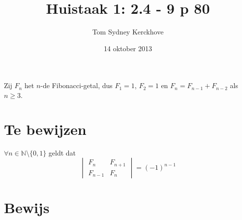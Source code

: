 \documentclass[10pt,a4paper]{article}
\title{Huistaak 1: 2.4 - 9 p 80}
\date{14 oktober 2013}
\author{Tom Sydney Kerckhove}
\begin{document}
\maketitle

Zij $F_{n}$ het $n$-de Fibonacci-getal, dus $F_{1}=1$, $F_{2}=1$ en $F_{n}=F_{n-1}+F_{n-2}$ als $n \ge 3$.
\section*{Te bewijzen}
$\forall n \in \mathbb{N}\setminus\{0,1\}$ geldt dat
\[
\begin{vmatrix}
F_{n}   & F_{n+1}\\
F_{n-1} & F_{n}
\end{vmatrix}
=
(-1)^{n-1}
\]
\section*{Bewijs}
\end{document}
